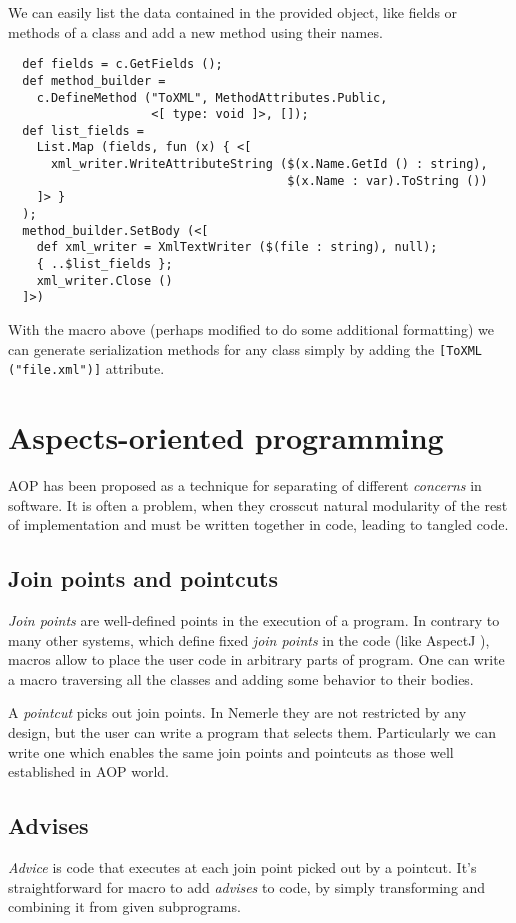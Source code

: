 \documentclass{llncs}
\begin{document}
We can easily list the data contained in the provided object, like fields 
or methods of a class and add a new method using their names.

\begin{verbatim}
  def fields = c.GetFields ();
  def method_builder = 
    c.DefineMethod ("ToXML", MethodAttributes.Public, 
                    <[ type: void ]>, []);
  def list_fields = 
    List.Map (fields, fun (x) { <[ 
      xml_writer.WriteAttributeString ($(x.Name.GetId () : string), 
                                       $(x.Name : var).ToString ()) 
    ]> }
  );
  method_builder.SetBody (<[
    def xml_writer = XmlTextWriter ($(file : string), null);
    { ..$list_fields };
    xml_writer.Close ()
  ]>)
\end{verbatim}

With the macro above (perhaps modified to do some additional formatting)
we can generate serialization methods for any class simply by adding 
the \verb,[ToXML ("file.xml")], attribute.

\section{Aspects-oriented programming}
AOP has been proposed as a technique for separating of different 
\emph{concerns} in software. It is often a problem, when they crosscut 
natural modularity of the rest of implementation and must be written 
together in code, leading to tangled code. 

\subsection{Join points and pointcuts}
\emph{Join points} are well-defined points in the execution of a program.
In contrary to many other systems, which define fixed \emph{join points}
in the code (like AspectJ \cite{AspectJ}), macros allow to place the user code in 
arbitrary parts of program. One can write a macro traversing all the classes
and adding some behavior to their bodies. 

A \emph{pointcut} picks out join points. In Nemerle they are not
restricted by any design, but the user can write a program that selects them.
Particularly we can write one which enables the same join points and pointcuts 
as those well established in AOP world.

\subsection{Advises}
\emph{Advice} is code that executes at each join point picked out by a pointcut.
It's straightforward for macro to add \emph{advises} to code, by simply transforming
and combining it from given subprograms.
\end{document}
